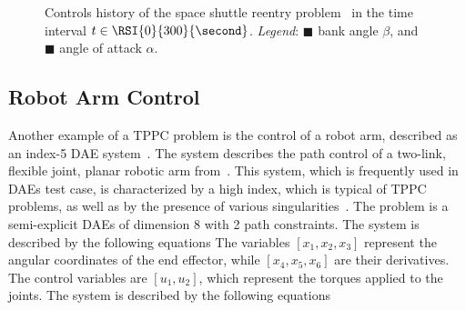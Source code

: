 \begin{figure}[htb]
  \centering
  \small{}
  \caption{Controls history of the space shuttle reentry problem~\cite{brenan1995numerical} in the time interval $t \in \RSI{0}{300}{\second}$. \emph{Legend}: \textcolor{mycolor1}{$\blacksquare$} bank angle $\beta$, and \textcolor{mycolor2}{$\blacksquare$} angle of attack $\alpha$.}
  \label{chap4:fig:tppc_final}
\end{figure}

\subsection{Robot Arm Control}

Another example of a \ac{TPPC} problem is the control of a robot arm, described as an index-5 \ac{DAE} system~\cite{pryce1998solving}. The system describes the path control of a two-link, flexible joint, planar robotic arm from~\cite{campbell1988general}. This system, which is frequently used in \acp{DAE} test case, is characterized by a high index, which is typical of \ac{TPPC} problems, as well as by the presence of various singularities~\cite{schwarz2020singularities}. The problem is a semi-explicit \acp{DAE} of dimension 8 with 2 path constraints. The system is described by the following equations The variables $[x_1, x_2, x_3]$ represent the angular coordinates of the end effector, while $[x_4, x_5, x_6]$ are their derivatives. The control variables are $[u_1, u_2]$, which represent the torques applied to the joints. The system is described by the following equations


